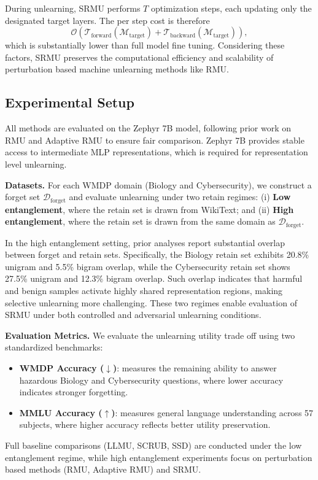 During unlearning, SRMU performs $T$ optimization steps, each updating only the designated target layers.
The per step cost is therefore
\[
\mathcal{O}(\mathcal{T}_{\text{forward}}(\mathcal{M}_{\text{target}}) + \mathcal{T}_{\text{backward}}(\mathcal{M}_{\text{target}})),
\]
which is substantially lower than full model fine tuning.
Considering these factors, SRMU preserves the computational efficiency and scalability of perturbation based machine unlearning methods like RMU.

\subsection{Experimental Setup}
All methods are evaluated on the Zephyr 7B model, following prior work on RMU and Adaptive RMU to ensure fair comparison. Zephyr 7B provides stable access to intermediate MLP representations, which is required for representation level unlearning.\par
\noindent\textbf{Datasets.}
For each WMDP domain (Biology and Cybersecurity), we construct a forget set $\mathcal{D}_{\text{forget}}$ and evaluate unlearning under two retain regimes:
(i) \textbf{Low entanglement}, where the retain set is drawn from WikiText; and
(ii) \textbf{High entanglement}, where the retain set is drawn from the same domain as $\mathcal{D}_{\text{forget}}$.

In the high entanglement setting, prior analyses \cite{10.1609/aaai.v39i22.34544} report substantial overlap between forget and retain sets. Specifically, the Biology retain set exhibits 20.8\% unigram and 5.5\% bigram overlap, while the Cybersecurity retain set shows 27.5\% unigram and 12.3\% bigram overlap. Such overlap indicates that harmful and benign samples activate highly shared representation regions, making selective unlearning more challenging. These two regimes enable evaluation of SRMU under both controlled and adversarial unlearning conditions.

\noindent\textbf{Evaluation Metrics.}
We evaluate the unlearning utility trade off using two standardized benchmarks:
\begin{itemize}
    \item \textbf{WMDP Accuracy ($\downarrow$)}: measures the remaining ability to answer hazardous Biology and Cybersecurity questions, where lower accuracy indicates stronger forgetting.
    \item \textbf{MMLU Accuracy ($\uparrow$)}: measures general language understanding across 57 subjects, where higher accuracy reflects better utility preservation.
\end{itemize}
Full baseline comparisons (LLMU, SCRUB, SSD) are conducted under the low entanglement regime, while high entanglement experiments focus on perturbation based methods (RMU, Adaptive RMU) and SRMU.

